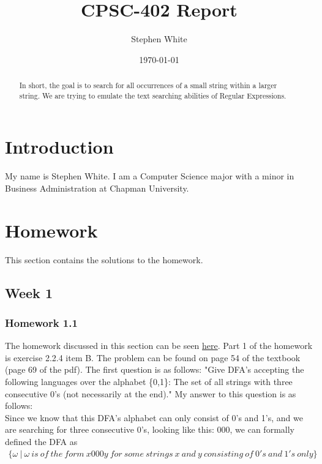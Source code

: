 \documentclass{article}
\title{CPSC-402 Report}
\author{Stephen White}
\date{\today}
\theoremstyle{theorem}
\theoremstyle{definition}
\theoremstyle{remark}
\begin{document}
\maketitle

\begin{abstract}
In short, the goal is to search for all occurrences of a small string within a larger string. We are trying to emulate the text searching abilities of Regular Expressions. 
\end{abstract}

\tableofcontents

\section{Introduction}\label{intro}

My name is Stephen White. I am a Computer Science major with a minor in Business Administration at Chapman University.

\section{Homework}\label{homework}

This section contains the solutions to the homework. 

\subsection{Week 1}


\subsubsection{Homework 1.1}
The homework discussed in this section can be seen \href{https://hackmd.io/@alexhkurz/rycnvMvgu}{here}.
Part 1 of the homework is exercise 2.2.4 item B. The problem can be found on page 54 of the textbook (page 69 of the pdf).
\newline \newline
The first question is as follows: "Give DFA's accepting the following languages over the alphabet \{0,1\}: The set of all strings with three consecutive 0's (not necessarily at the end)."
\newline\newline
My answer to this question is as follows:\\
Since we know that this DFA's alphabet can only consist of 0's and 1's, and we are searching for three consecutive 0's, looking like this: 000, we can formally defined the DFA as 
\begin{align*}
    \{\omega\ |\ \omega\ is\ of\ the\ form\ x000y\ for\ some\ strings\ x\ and\ y\ consisting\ of\ 0's\ and\ 1's\ only \}
\end{align*}
\end{document}
